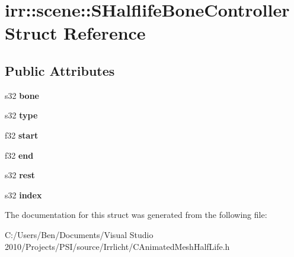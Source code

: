 \hypertarget{structirr_1_1scene_1_1_s_halflife_bone_controller}{\section{irr\-:\-:scene\-:\-:S\-Halflife\-Bone\-Controller Struct Reference}
\label{structirr_1_1scene_1_1_s_halflife_bone_controller}
}
\subsection*{Public Attributes}
\begin{DoxyCompactItemize}
\item 
\hypertarget{structirr_1_1scene_1_1_s_halflife_bone_controller_a73562463b7a320c47acb8a3a1bf5ac69}{s32 {\bfseries bone}}\label{structirr_1_1scene_1_1_s_halflife_bone_controller_a73562463b7a320c47acb8a3a1bf5ac69}

\item 
\hypertarget{structirr_1_1scene_1_1_s_halflife_bone_controller_ac47f66a0d379efcef56e83ca5f163dc3}{s32 {\bfseries type}}\label{structirr_1_1scene_1_1_s_halflife_bone_controller_ac47f66a0d379efcef56e83ca5f163dc3}

\item 
\hypertarget{structirr_1_1scene_1_1_s_halflife_bone_controller_a2ba3c05197bbcf89f3de178b8708d9a2}{f32 {\bfseries start}}\label{structirr_1_1scene_1_1_s_halflife_bone_controller_a2ba3c05197bbcf89f3de178b8708d9a2}

\item 
\hypertarget{structirr_1_1scene_1_1_s_halflife_bone_controller_a3b393492577663a2e4629721bcf45d2d}{f32 {\bfseries end}}\label{structirr_1_1scene_1_1_s_halflife_bone_controller_a3b393492577663a2e4629721bcf45d2d}

\item 
\hypertarget{structirr_1_1scene_1_1_s_halflife_bone_controller_ad110074cafee09b8c91fb0d5e6fd157a}{s32 {\bfseries rest}}\label{structirr_1_1scene_1_1_s_halflife_bone_controller_ad110074cafee09b8c91fb0d5e6fd157a}

\item 
\hypertarget{structirr_1_1scene_1_1_s_halflife_bone_controller_aeffc6a71b435d9221566dbc50dc4d16e}{s32 {\bfseries index}}\label{structirr_1_1scene_1_1_s_halflife_bone_controller_aeffc6a71b435d9221566dbc50dc4d16e}

\end{DoxyCompactItemize}


The documentation for this struct was generated from the following file\-:\begin{DoxyCompactItemize}
\item 
C\-:/\-Users/\-Ben/\-Documents/\-Visual Studio 2010/\-Projects/\-P\-S\-I/source/\-Irrlicht/C\-Animated\-Mesh\-Half\-Life.\-h\end{DoxyCompactItemize}
